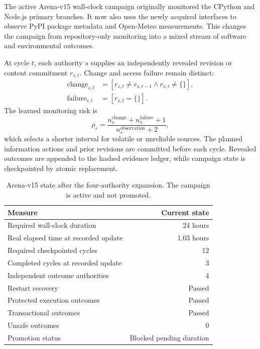 The active Arena-v15 wall-clock campaign originally monitored the CPython and
Node.js primary branches.  It now also uses the newly acquired interfaces to
observe PyPI package metadata and Open-Meteo measurements.  This changes the
campaign from repository-only monitoring into a mixed stream of software and
environmental outcomes.

At cycle $t$, each authority $s$ supplies an independently revealed revision or
content commitment $r_{s,t}$.  Change and access failure remain distinct:
\begin{align}
 \mathrm{change}_{s,t}&=[r_{s,t}\neq r_{s,t-1}\land
                         r_{s,t}\neq\{\}],\\
 \mathrm{failure}_{s,t}&=[r_{s,t}=\{\}].
\end{align}
The learned monitoring risk is
\begin{equation}
 \rho_s=\frac{n^{\mathrm{change}}_s+n^{\mathrm{failure}}_s+1}
 {n^{\mathrm{observation}}_s+2},
\end{equation}
which selects a shorter interval for volatile or unreliable sources.  The
planned information actions and prior revisions are committed before each
cycle.  Revealed outcomes are appended to the hashed evidence ledger, while
campaign state is checkpointed by atomic replacement.

\begin{table}[htbp]
\centering
\caption{Arena-v15 state after the four-authority expansion.  The campaign is
active and not promoted.}
\label{tab:v15-expanded-state}
\begin{tabular}{lr}
\hline
Measure & Current state \\
\hline
Required wall-clock duration & 24 hours \\
Real elapsed time at recorded update & 1.03 hours \\
Required checkpointed cycles & 12 \\
Completed cycles at recorded update & 3 \\
Independent outcome authorities & 4 \\
Restart recovery & Passed \\
Protected execution outcomes & Passed \\
Transactional outcomes & Passed \\
Unsafe outcomes & 0 \\
Promotion status & Blocked pending duration \\
\hline
\end{tabular}
\end{table}

